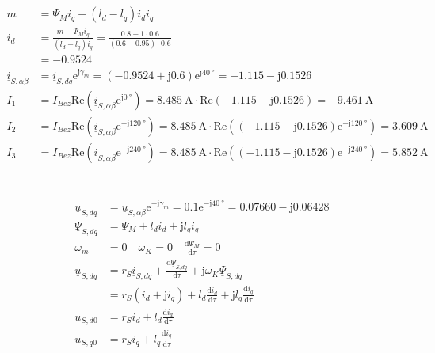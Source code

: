 \documentclass[11pt,a4paper]{scrartcl}
\newcommand{\mybr}[1]{\left(#1\right)}
\renewcommand{\j}{\mathrm{j}}
\renewcommand{\u}{\underline{u}}
\renewcommand{\i}{\underline{i}}
\newcommand{\PPsi}{\underline{\Psi}}
\newcommand{\0}{_{\mybr{0}}}
\newcommand{\1}{_{\mybr{1}}}
\newcommand{\2}{_{\mybr{2}}}
\renewcommand{\e}{\mathrm{e}}
\renewcommand{\d}{\mathrm{d}}
\renewcommand{\Re}{\mathrm{Re}}
\newcommand{\isab}{\i_{S,\alpha\beta}}
\newcommand{\isdq}{\i_{S,dq}}
\newcommand{\usab}{\u_{S,\alpha\beta}}
\newcommand{\usdq}{\u_{S,dq}}
\newcommand{\psdq}{\PPsi_{S,dq}}
\begin{document}
\section{}
\begin{align}
m&=\Psi_M i_q+\mybr{l_d-l_q} i_d i_q\\
i_d&=\frac{m-\Psi_M i_q}{\mybr{l_d-l_q}i_q}=\frac{\num{0.8}-1\cdot\num{0.6}}{\mybr{\num{0.6}-\num{0.95}}\cdot\num{0.6}}\\
&=\num{-0.9524}\\
\isab&=\isdq\e^{\j\gamma_m}=\mybr{\num{-0.9524}+\j\num{0.6}}\e^{\j\SI{40}{\degree}}=\num{-1.115}-\j\num{0.1526}\\
I_1&=I_{Bez}\Re\mybr{\isab\e^{\j\SI{0}{\degree}}}=\SI{8.485}{\ampere}\cdot\Re\mybr{\num{-1.115}-\j\num{0.1526}}=\SI{-9.461}{\ampere}\\
I_2&=I_{Bez}\Re\mybr{\isab\e^{-\j\SI{120}{\degree}}}=\SI{8.485}{\ampere}\cdot\Re\mybr{\mybr{\num{-1.115}-\j\num{0.1526}}\e^{-\j\SI{120}{\degree}}}=\SI{3.609}{\ampere}\\	
I_3&=I_{Bez}\Re\mybr{\isab\e^{-\j\SI{240}{\degree}}}=\SI{8.485}{\ampere}\cdot\Re\mybr{\mybr{\num{-1.115}-\j\num{0.1526}}\e^{-\j\SI{240}{\degree}}}=\SI{5.852}{\ampere}
\end{align}

\section{}
\subsection{}
\begin{align}
\usdq&=\usab\e^{-\j\gamma_m}=\num{0.1}\e^{-\j\SI{40}{\degree}}=\num{0.07660}-\j\num{0.06428}\\
\psdq&=\Psi_M+l_d i_d+\j l_q i_q\\
\omega_m&=0\quad\omega_K=0\quad\frac{\d\Psi_M}{\d\tau}=0\\
\usdq&=r_S\isdq+\frac{\d\psdq}{\d\tau}+\j\omega_K\psdq\\
&=r_S\mybr{i_d+\j i_q}+l_d\frac{\d i_d}{\d\tau}+\j l_q\frac{\d i_q}{\d\tau}\\
u_{S,d0}&=r_S i_d+l_d\frac{\d i_d}{\d\tau}\\
u_{S,q0}&=r_S i_q+l_q\frac{\d i_q}{\d\tau}
\end{align}
\end{document}
